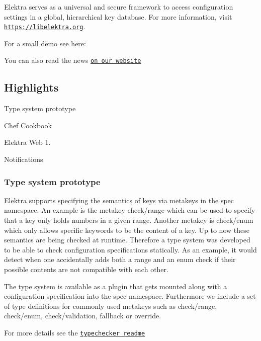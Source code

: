 Elektra serves as a universal and secure framework to access configuration settings in a global, hierarchical key database. For more information, visit \href{https://libelektra.org}{\tt https\+://libelektra.\+org}.

For a small demo see here\+:

\href{https://asciinema.org/a/cantr04assr4jkv8v34uz9b8r}{\tt }

You can also read the news \href{https://www.libelektra.org/news/0.8.24-release}{\tt on our website}

\subsection*{Highlights}


\begin{DoxyItemize}
\item Type system prototype
\item Chef Cookbook
\item Elektra Web 1.
\item Notifications
\end{DoxyItemize}

\subsubsection*{Type system prototype}

Elektra supports specifying the semantics of keys via metakeys in the {\ttfamily spec} namespace. An example is the metakey {\ttfamily check/range} which can be used to specify that a key only holds numbers in a given range. Another metakey is {\ttfamily check/enum} which only allows specific keywords to be the content of a key. Up to now these semantics are being checked at runtime. Therefore a type system was developed to be able to check configuration specifications statically. As an example, it would detect when one accidentally adds both a range and an enum check if their possible contents are not compatible with each other.

The type system is available as a plugin that gets mounted along with a configuration specification into the spec namespace. Furthermore we include a set of type definitions for commonly used metakeys such as {\ttfamily check/range}, {\ttfamily check/enum}, {\ttfamily check/validation}, {\ttfamily fallback} or {\ttfamily override}.

For more details see the \href{https://www.libelektra.org/plugins/typechecker}{\tt typechecker readme}

